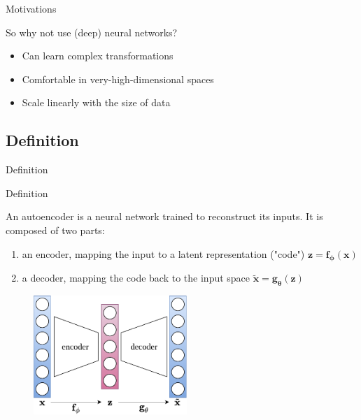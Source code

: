 \documentclass{beamer}
\begin{document}
  \begin{frame}{Motivations}
    

    \begin{block}{So why not use (deep) neural networks?}
      \begin{itemize}
        \item Can learn complex transformations
        \item Comfortable in very-high-dimensional spaces
        \item Scale linearly with the size of data
      \end{itemize}
    \end{block}
    
  \end{frame}

  \subsection{Definition}

  \begin{frame}{Definition}


    \begin{exampleblock}{Definition}
      \small{
      An \alert{autoencoder} is a neural network trained to reconstruct its inputs. It is composed of two parts:
      \vspace{-0.4cm}
      \begin{enumerate}
        \item an \alert{encoder}, mapping the input to a latent representation ("code") $\mathbf{z} = \mathbf{f}_{\boldsymbol{\phi}}(\mathbf{x})$
        \item a \alert{decoder}, mapping the code back to the input space $\tilde{\mathbf{x}} = \mathbf{g}_{\boldsymbol{\theta}}(\mathbf{z})$
      \end{enumerate}
      }
    \end{exampleblock}
    \vspace{-0.25cm}
    \begin{figure}
      \includegraphics[height=4.5cm]{rc/autoencoder}
    \end{figure}

  \end{frame}
\end{document}
